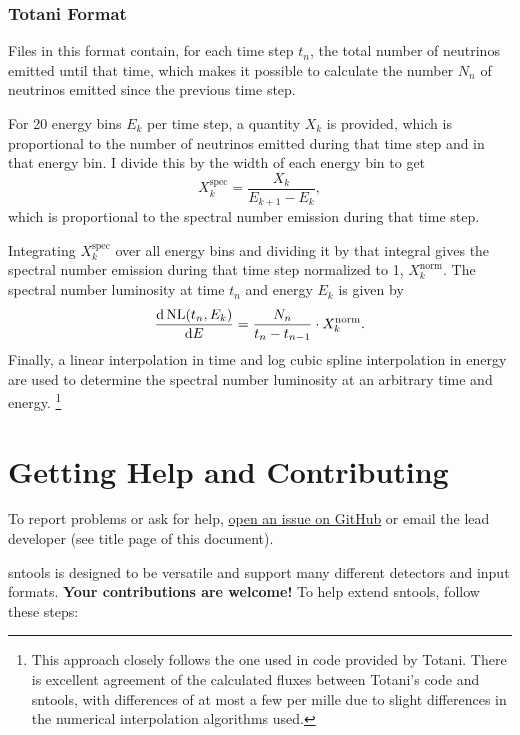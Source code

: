 \documentclass[11pt, oneside]{article}
\renewcommand{\d}{\mathrm{d}}
\newcommand{\tdiff}[3][\empty]{\ifx\empty#1
		\frac{\d\,#2}{\d #3}
	\else
		\frac{\d^{#1}\,#2}{\d #3^{#1}}
	\fi} %
\begin{document}
\subsubsection{Totani Format}
Files in this format contain, for each time step $t_n$, the total number of neutrinos emitted until that time, which makes it possible to calculate the number $N_n$ of neutrinos emitted since the previous time step.

For 20 energy bins $E_k$ per time step, a quantity $X_k$ is provided, which is proportional to the number of neutrinos emitted during that time step and in that energy bin.
I divide this by the width of each energy bin to get
\begin{equation}
X_k^\text{spec} = \frac{X_k}{E_{k+1} - E_k},
\end{equation}
which is proportional to the spectral number emission during that time step.

Integrating $X_k^\text{spec}$ over all energy bins and dividing it by that integral gives the spectral number emission during that time step normalized to 1, $X_k^\text{norm}$.
The spectral number luminosity at time $t_n$ and energy $E_k$ is given by
\begin{equation}
\tdiff{\text{NL} (t_n, E_k)}{E} = \frac{N_n}{t_n - t_{n-1}} \cdot X_k^\text{norm}.
\end{equation}
Finally, a linear interpolation in time and log cubic spline interpolation in energy are used to determine the spectral number luminosity at an arbitrary time and energy.%
\footnote{This approach closely follows the one used in code provided by Totani. There is excellent agreement of the calculated fluxes between Totani’s code and sntools, with differences of at most a few per mille due to slight differences in the numerical interpolation algorithms used.}



\section{Getting Help and Contributing}

To report problems or ask for help, \href{https://github.com/JostMigenda/sntools/issues}{open an issue on GitHub} or email the lead developer (see title page of this document).

sntools is designed to be versatile and support many different detectors and input formats.
\textbf{Your contributions are welcome!}
To help extend sntools, follow these steps:
\end{document}
